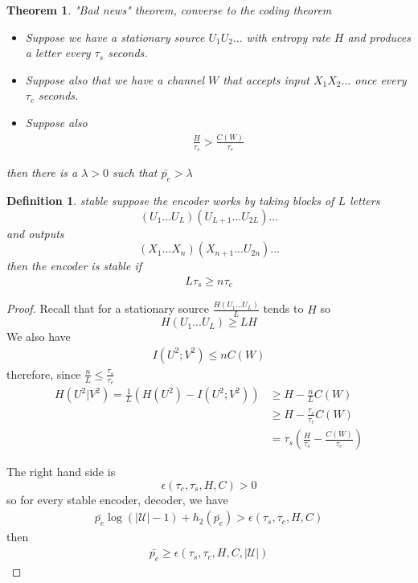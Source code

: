 \documentclass[twoside]{article}
\newtheorem{theorem}{Theorem}[section]
\newtheorem{definition}{Definition}[section]
\theoremstyle{definition} %
\def\U{\mathcal{U}}
\begin{document}
\begin{theorem}{"Bad news" theorem, converse to the coding theorem}
  \begin{itemize}
    \item Suppose we have a stationary source $U_1 U_2 ...$ with entropy rate $H$ and produces a letter every $\tau_s$ seconds.
    \item Suppose also that we have a channel $W$ that accepts input $X_1 X_2 ...$ once every $\tau_c$ seconds.
    \item Suppose also
    \begin{align*}
      \frac{H}{\tau_s} > \frac{C(W)}{\tau_c}
    \end{align*}
  \end{itemize}
  then there is a $\lambda > 0$ such that $\bar{p_e} > \lambda$
\end{theorem}

\begin{definition}{stable}
  suppose the encoder works by taking blocks of $L$ letters
  $$(U_1 ... U_L)(U_{L+1} ... U_{2L})...$$
  and outputs
  $$(X_1 ... X_n)(X_{n+1} ... U_{2n})...$$
  then the encoder is stable if
  \begin{align*}
    L \tau_s \geq n \tau_c
  \end{align*}
\end{definition}

\begin{proof}
  Recall that for a stationary source $\frac{H(U_1 ... U_L)}{L}$ tends to $H$ so
  $$ H(U_1 ... U_L) \geq L H$$
  We also have
  \begin{align*}
    I(U^2; V^2) \leq n C(W)
  \end{align*}
  therefore, since $\frac{n}{L} \leq \frac{\tau_s}{\tau_c}$
  \begin{align*}
    H(U^2 | V^2) = \frac{1}{L} (H(U^2) - I(U^2; V^2)) &\geq H - \frac{n}{L} C(W) \\
    &\geq H - \frac{\tau_s}{\tau_c} C(W) \\
    &= \tau_s (\frac{H}{\tau_s} - \frac{C(W)}{\tau_c})
  \end{align*}

  The right hand side is
  $$\epsilon(\tau_c, \tau_s, H, C) > 0$$
  so for every stable encoder, decoder, we have
  \begin{align*}
    \bar{p_e} \log(|\U| - 1) + h_2(\bar{p_e}) > \epsilon(\tau_s, \tau_c, H, C)
  \end{align*}
  then
  \begin{align*}
    \bar{p_e} \geq \epsilon(\tau_s, \tau_c, H, C, |\U|)
  \end{align*}
\end{proof}
\end{document}
